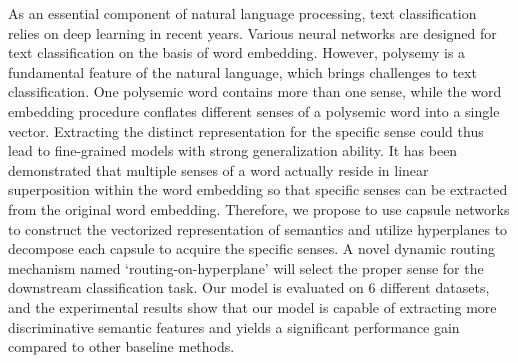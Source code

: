 As an essential component of natural language processing, text classification relies on deep learning in recent years.
Various neural networks are designed for text classification on the basis of word embedding.
However, polysemy is a fundamental feature of the natural language, which brings challenges to text classification. 
One polysemic word contains more than one sense, while the word embedding procedure conflates different senses of a polysemic word into a single vector. 
Extracting the distinct representation for the specific sense could thus lead to fine-grained models with strong generalization ability.
It has been demonstrated that multiple senses of a word actually reside in linear superposition within the word embedding so that specific senses can be extracted from the original word embedding. 
Therefore, 
we propose to use capsule networks to construct the vectorized representation of semantics and utilize hyperplanes to decompose each capsule to acquire the specific senses.
A novel dynamic routing mechanism named `routing-on-hyperplane' will select the proper sense for the downstream classification task.
Our model is evaluated on 6 different datasets, and the experimental results show that our model is capable of extracting more discriminative semantic features and yields a significant performance gain compared to other baseline methods.